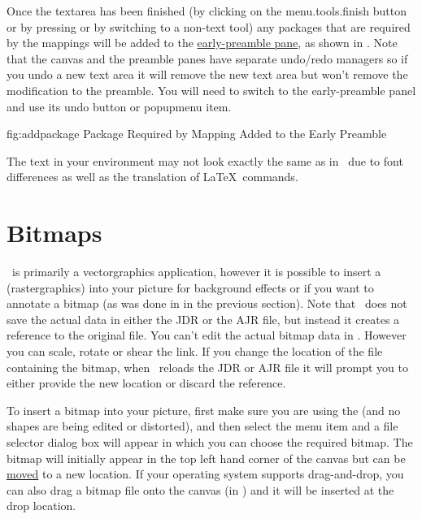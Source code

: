 Once the \gls{textarea} has been finished (by clicking on the
\gls{menu.tools.finish} button or by pressing
 or by switching to a non-text
tool) any packages that are required by the mappings will be added
to the \hyperref[sec:preamble]{early-preamble pane}, as shown in
.  Note that the \gls{canvas} and the
preamble panes have separate undo\slash redo managers so if you undo
a new text area it will remove the new text area but won't remove
the modification to the preamble. You will need to switch to the
early-preamble panel and use its undo button or \gls{popupmenu} item.

\FloatFig
  {fig:addpackage}
  {}
  {Package Required by Mapping Added to the Early Preamble}

\begin{important}
The text in your  environment may not
look exactly the same as in \FlowframTk\ due to font differences as
well as the translation of \LaTeX\ commands.
\end{important}


\chapter{Bitmaps}\label{sec:insertbitmap}


\FlowframTk\ is primarily a \gls{vectorgraphics} application,
however it is possible to insert a 
(\gls{rastergraphics}) into your picture for background effects or
if you want to annotate a \gls{bitmap} (as was done in
 in the previous section).  Note that
\FlowframTk\ does not save the actual  data in either
the \gls{JDR} or the \gls{AJR} file, but instead it creates a reference
to the original file. You can't edit the actual bitmap data in
\FlowframTk. However you can scale, rotate or shear the link.  If
you change the location of the file containing the bitmap, when
\FlowframTk\ reloads the \gls*{JDR} or \gls*{AJR} file it will
prompt you to either provide the new location or discard the reference.


To insert a \gls{bitmap} into your picture, first make sure you are using
the  (and no shapes are
being edited or distorted), and then select the menu item
 and a file selector dialog box will appear in which
you can choose the required \gls{bitmap}. The \gls{bitmap} will initially appear
in the top left hand corner of the \gls{canvas} but can be
\hyperref[sec:moveobjects]{moved} to a new location.  If your
operating system supports \gls{drag-and-drop}, you can also drag a
\gls{bitmap} file onto the \gls{canvas} (in \selectmode) and it will
be inserted at the drop location.

